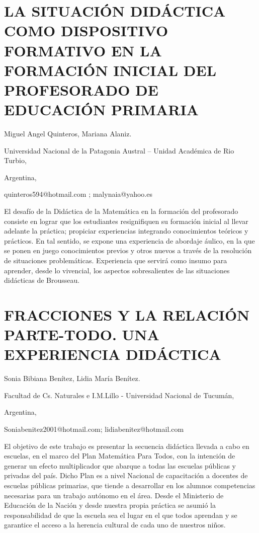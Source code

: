 \section{\uppercase{ La situación didáctica como dispositivo formativo en
la formación inicial del profesorado de educación primaria}}

\begin{datos}

Miguel Angel Quinteros, Mariana Alaniz.

Universidad Nacional de la Patagonia Austral – Unidad Académica de
Rio Turbio,

Argentina,

quinteros594@hotmail.com ; malynaia@yahoo.es 

\end{datos}

El desafío de la Didáctica de la Matemática en la formación del profesorado
consiste en lograr que los estudiantes resignifiquen su formación
inicial al llevar adelante la práctica; propiciar experiencias integrando
conocimientos teóricos y prácticos. En tal sentido, se expone una
experiencia de abordaje áulico, en la que se ponen en juego conocimientos
previos y otros nuevos a través de la resolución de situaciones problemáticas.
Experiencia que servirá como insumo para aprender, desde lo vivencial,
los aspectos sobresalientes de las situaciones didácticas de Brousseau. 


\section{\uppercase{ Fracciones y la relación parte-todo. Una experiencia
didáctica}}

\begin{datos}

Sonia Bibiana Benítez, Lidia María Benítez.

Facultad de Cs. Naturales e I.M.Lillo - Universidad Nacional de Tucumán,

Argentina,

Soniabenitez2001@hotmail.com; lidiabenitez@hotmail.com

\end{datos}

El objetivo de este trabajo es presentar la secuencia didáctica llevada
a cabo en escuelas, en el marco del Plan Matemática Para Todos, con
la intención de generar un efecto multiplicador que abarque a todas
las escuelas públicas y privadas del país. Dicho Plan es a nivel Nacional
de capacitación a docentes de escuelas públicas primarias, que tiende
a desarrollar en los alumnos competencias necesarias para un trabajo
autónomo en el área. Desde el Ministerio de Educación de la Nación
y desde nuestra propia práctica se asumió la responsabilidad de que
la escuela sea el lugar en el que todos aprendan y se garantice el
acceso a la herencia cultural de cada uno de nuestros niños. 

